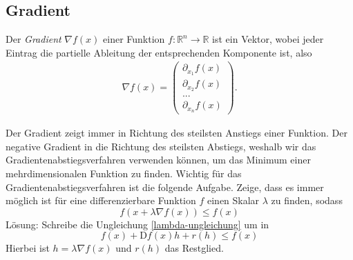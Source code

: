 \subsection{Gradient}
\begin{Def}
Der \emph{Gradient} $\nabla f(x)$ einer Funktion $f:\mathbb{R}^n\rightarrow \mathbb{R}$ ist ein Vektor, wobei jeder Eintrag die partielle Ableitung der entsprechenden Komponente ist, also
\begin{equation*} \begin{split} \nabla f(x) = \left( \begin{array}{c}
\partial_{x_1} f(x) \\
\partial_{x_2} f(x) \\
... \\
\partial_{x_n} f(x)
\end{array}
\right).
\end{split} \end{equation*} 
\end{Def}
Der Gradient zeigt immer in Richtung des steilsten Anstiegs einer Funktion. Der negative Gradient in die Richtung des steilsten Abstiegs, weshalb wir das Gradientenabstiegsverfahren verwenden können, um das Minimum einer mehrdimensionalen Funktion zu finden. Wichtig für das Gradientenabstiegsverfahren ist die folgende Aufgabe.
Zeige, dass es immer möglich ist für eine differenzierbare Funktion $f$ einen Skalar $\lambda$ zu finden, sodass
\begin{equation}\label{lambda-ungleichung}f(x + \lambda \nabla f(x)) \leq f(x)\end{equation} 
Lösung:
Schreibe die Ungleichung \eqref{lambda-ungleichung} um in
\begin{equation*}
f(x) + \text{D} f(x)h + r(h) \leq f(x)
\end{equation*}
Hierbei ist $h = \lambda \nabla f(x)$ und $r(h)$ das Restglied.


